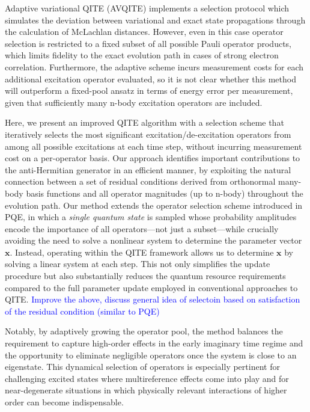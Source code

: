 \documentclass[aip,jcp,amsmath,amssymb, reprint]{revtex4-1}
\newcommand{\note}[2]{%
  \ifthenelse{\boolean{shownotes}}%
    {\textcolor{#1}{#2}}%
    {}%
}
\begin{document}
Adaptive variational QITE (AVQITE)\cite{gomes2021adaptive} implements a selection protocol which simulates the deviation between variational and exact state propagations through the calculation of McLachlan distances. However, even in this case operator selection is restricted to a fixed subset of all possible Pauli operator products, which limits fidelity to the exact evolution path in cases of strong electron correlation. Furthermore, the adaptive scheme incurs measurement costs for each additional excitation operator evaluated, so it is not clear whether this method will outperform a fixed-pool ansatz in terms of energy error per measurement, given that sufficiently many n-body excitation operators are included. 

Here, we present an improved QITE algorithm with a selection scheme that iteratively selects the most significant excitation/de-excitation operators from among all possible excitations at each time step, without incurring measurement cost on a per-operator basis. Our approach identifies important contributions to the anti-Hermitian generator in an efficient manner, by exploiting the natural connection between a set of residual conditions derived from orthonormal many-body basis functions and all operator magnitudes (up to n-body) throughout the evolution path. Our method extends the operator selection scheme introduced in PQE,\cite{stair2021simulating} in which a \textit{single quantum state} is sampled whose probability amplitudes encode the importance of all operators---not just a subset---while crucially avoiding the need to solve a nonlinear system to determine the parameter vector $\mathbf{x}$. Instead, operating within the QITE framework allows us to determine $\mathbf{x}$ by solving a linear system at each step. This not only simplifies the update procedure but also substantially reduces the quantum resource requirements compared to the full parameter update employed in conventional approaches to QITE.
\note{blue}{Improve the above, discuss general idea of selectoin based on satisfaction of the residual condition (similar to PQE)}
Notably, by adaptively growing the operator pool, the method balances the requirement to capture high-order effects in the early imaginary time regime and the opportunity to eliminate negligible operators once the system is close to an eigenstate. 
This dynamical selection of operators is especially pertinent for challenging excited states where multireference effects come into play and for near-degenerate situations in which physically relevant interactions of higher order can become indispensable. 
\end{document}
